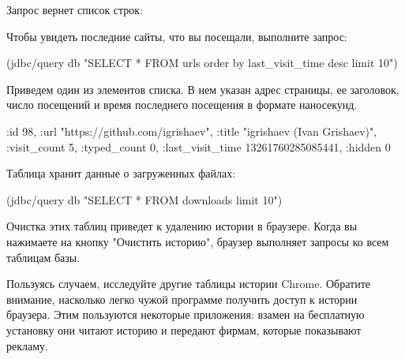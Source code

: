 Запрос вернет список строк:

\begin{english}
  \begin{clojure}
  \end{clojure}
\end{english}

Чтобы увидеть последние сайты, что вы посещали, выполните запрос:

\begin{english}
  \begin{clojure}
(jdbc/query db "SELECT * FROM urls order by last_visit_time desc limit 10")
  \end{clojure}
\end{english}

Приведем один из элементов списка. В нем указан адрес страницы, ее заголовок, число посещений и время последнего посещения в формате наносекунд.

\begin{english}
  \begin{clojure}
{:id 98,
 :url "https://github.com/igrishaev",
 :title "igrishaev (Ivan Grishaev)",
 :visit_count 5,
 :typed_count 0,
 :last_visit_time 13261760285085441,
 :hidden 0}
  \end{clojure}
\end{english}

Таблица  хранит данные о загруженных файлах:

\begin{english}
  \begin{clojure}
(jdbc/query db "SELECT * FROM downloads limit 10")
  \end{clojure}
\end{english}

Очистка этих таблиц приведет к удалению истории в браузере. Когда вы нажимаете на кнопку "Очистить историю", браузер выполняет запросы  ко всем таблицам базы.

Пользуясь случаем, исследуйте другие таблицы истории Chrome. Обратите внимание, насколько легко чужой программе получить доступ к истории браузера. Этим пользуются некоторые приложения: взамен на бесплатную установку они читают историю и передают фирмам, которые показывают рекламу.

